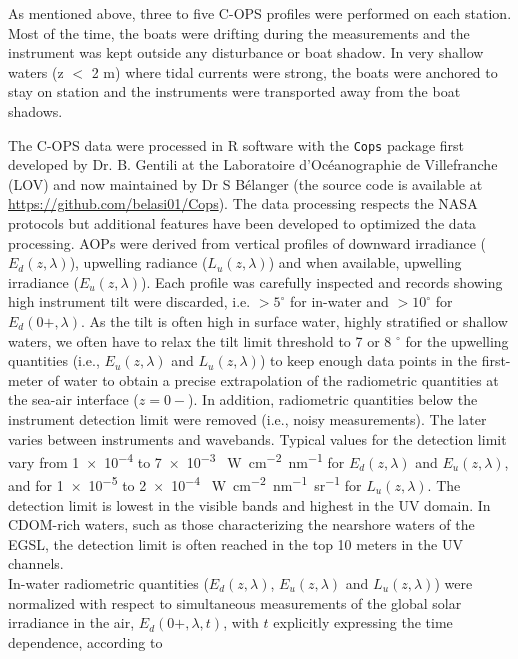 \documentclass[essd, manuscript]{copernicus}
\begin{document}
As mentioned above, three to five C-OPS profiles were performed on each station. Most of the time, the boats were drifting during the measurements and the instrument was kept outside any disturbance or boat shadow. In very shallow waters (z $<$ 2 m) where tidal currents were strong, the boats were anchored to stay on station and the instruments were transported away from the boat shadows. 
 
The C-OPS data were processed in R software with the \texttt{Cops} package first developed by Dr. B. Gentili at the Laboratoire d'Océanographie de Villefranche (LOV) and now maintained by Dr S Bélanger (the source code is available at \url{https://github.com/belasi01/Cops}). The data processing respects the NASA protocols \citep{Mueller2003vIII} but additional features have been developed to optimized the data processing. AOPs were derived from vertical profiles of downward irradiance ($E_d(z,\lambda)$), upwelling radiance ($L_u(z,\lambda)$) and when available, upwelling irradiance ($E_u(z,\lambda)$). Each profile was carefully inspected and records showing high instrument tilt were discarded, i.e. $> 5^{\circ}$ for in-water and $> 10^{\circ}$ for $E_d(0+,\lambda)$. As the tilt is often high in surface water, highly stratified or shallow waters, we often have to relax the tilt limit threshold to 7 or 8 $^{\circ}$ for the upwelling quantities (i.e., $E_u(z,\lambda)$ and $L_u(z,\lambda)$) to keep enough data points in the first-meter of water to obtain a precise extrapolation of the radiometric quantities at the sea-air interface ($z=0-$). In addition, radiometric quantities below the instrument detection limit were removed (i.e., noisy measurements). The later varies between instruments and wavebands. Typical values for the detection limit vary from \num{1e-4} to \num{7e-3} \si{\micro.W.cm^{-2}.nm^{-1}} for $E_d(z,\lambda)$ and $E_u(z,\lambda)$, and for \num{1e-5} to \num{2e-4} \si{\micro.W.cm^{-2}.nm^{-1}.sr^{-1}} for $L_u(z,\lambda)$. The detection limit is lowest in the visible bands and highest in the UV domain. In CDOM-rich waters, such as those characterizing the nearshore waters of the EGSL, the detection limit is often reached in the top 10 meters in the UV channels.\\ 

In-water radiometric quantities ($E_d(z,\lambda)$, $E_u(z,\lambda)$ and $L_u(z,\lambda)$) were normalized with respect to simultaneous measurements of the global solar irradiance in the air, $E_d(0+,\lambda,t)$, with $t$ explicitly expressing the time dependence, according to
\end{document}
